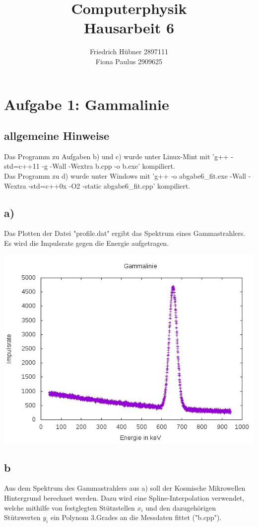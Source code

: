 \documentclass{scrreprt}
\author{Friedrich Hübner 2897111\\
	Fiona Paulus 2909625}
\title{Computerphysik\\Hausarbeit 6}
\begin{document}
	\maketitle
	\newpage
	
\chapter*{Aufgabe 1: Gammalinie}
\section*{allgemeine Hinweise}
Das Programm zu Aufgaben b) und c) wurde unter Linux-Mint mit 'g++ -std=c++11 -g -Wall -Wextra b.cpp -o b.exe' kompiliert.\\
Das Programm zu d) wurde unter Windows mit 'g++ -o abgabe6\_fit.exe -Wall -Wextra -std=c++0x -O2 -static abgabe6\_fit.cpp' kompiliert.
\section*{a)}
Das Plotten der Datei "profile.dat" ergibt das Spektrum eines Gammastrahlers. Es wird die Impulsrate gegen die Energie aufgetragen.
\begin{center}
	\includegraphics*[scale=0.7]{a.jpeg}
\end{center}

\section*{b}
Aus dem Spektrum des Gammastrahlers aus a) soll der Kosmische Mikrowellen Hintergrund berechnet werden. Dazu wird eine Spline-Interpolation verwendet, welche mithilfe von festglegten Stützstellen $x_i$ und den dazugehörigen Stützwerten $y_i$ ein Polynom 3.Grades an die Messdaten fittet ("b.cpp").
\end{document}
